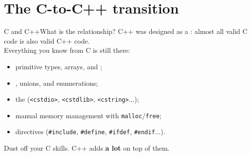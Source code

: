 
\section{The C-to-C++ transition}
\graphicspath{{figs/section1/}}

\begin{frame}{C and C++}{What is the relationship?}
	\justifying
	C++ was designed as a : almost all valid C code is also valid C++ code.\\
	\bigskip
	Everything you know from C is still there:
	\begin{itemize}
		\item primitive types, arrays, and ;
		\item {}, unions, and enumerations;
		\item the  (\texttt{<cstdio>}, \texttt{<cstdlib>}, \texttt{<cstring>}...);
		\item manual memory management with \texttt{malloc}/\texttt{free};
		\item {} directives (\texttt{\#include}, \texttt{\#define}, \texttt{\#ifdef}, \texttt{\#endif}...).
	\end{itemize}
	\begin{block}{}
		\centering
		Dust off your C skills. C++ adds \textbf{a lot} on top of them.
	\end{block}
\end{frame}

